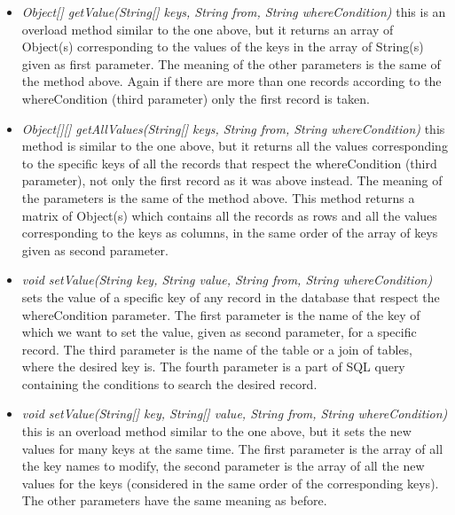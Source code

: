\documentclass[\mainpath/main]{subfiles}
\begin{document}
\begin{itemize}
\begin{itemize}
		\item \textit{Object[] getValue(String[] keys, String from, String whereCondition)}
		this is an overload method similar to the one above, but it returns an array of Object(s) corresponding to the values of the keys in the array of String(s) given as first parameter. The meaning of the other parameters is the same of the method above. Again if there are more than one records according to the whereCondition (third parameter) only the first record is taken.
		
		\item \textit{Object[][] getAllValues(String[] keys, String from, String whereCondition)}
		this method is similar to the one above, but it returns all the values corresponding to the specific keys of all the records that respect the whereCondition (third parameter), not only the first record as it was above instead. The meaning of the parameters is the same of the method above. This method returns a matrix of Object(s) which contains all the records as rows and all the values corresponding to the keys as columns, in the same order of the array of keys given as second parameter.
		
		\item \textit{void setValue(String key, String value, String from, String whereCondition)}
		sets the value of a specific key of any record in the database that respect the whereCondition parameter. The first parameter is the name of the key of which we want to set the value, given as second parameter, for a specific record. The third parameter is the name of the table or a join of tables, where the desired key is. The fourth parameter is a part of SQL query containing the conditions to search the desired record.
		
		\item \textit{void setValue(String[] key, String[] value, String from, String whereCondition)}
		this is an overload method similar to the one above, but it sets the new values for many keys at the same time. The first parameter is the array of all the key names to modify, the second parameter is the array of all the new values for the keys (considered in the same order of the corresponding keys). The other parameters have the same meaning as before.
		\\
	\end{itemize}
		
	
\end{itemize}
\end{document}
